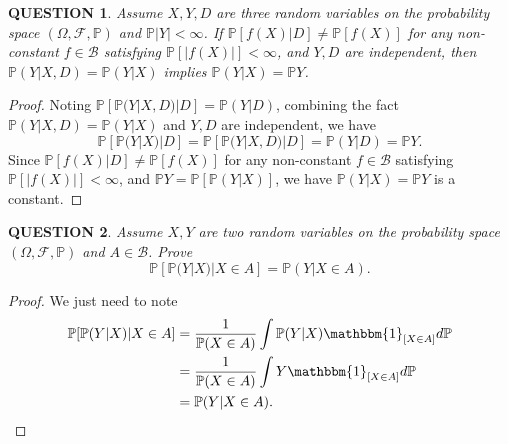 \documentclass[12pt]{article}
\renewcommand{\b}{\mathscr{B}}
\renewcommand{\(}{\left(}%
\renewcommand{\)}{\right)}%
\renewcommand{\[}{\left[}%
\renewcommand{\]}{\right]}%
\newcommand{\p}{\mathbb{P}}
\newcommand{\f}{\mathscr{F}}
\newtheorem{question}{QUESTION}[section]}
\newtheorem{proof}{Proof.}}
\begin{document}
  \begin{question}
  	Assume $X, Y, D$ are three random variables on the probability space $(\Omega,\f,\p)$ and $\p|Y|<\infty$. If $\p[f(X)|D]\neq \p[f(X)]$ for any non-constant $f\in\b$ satisfying $\p[|f(X)|]<\infty$, and $Y,D$ are independent, then $\p(Y|X,D)=\p(Y|X)$ implies $\p(Y|X)=\p Y$.
  \end{question}
  \begin{proof}
  	Noting $\p[\p(Y|X,D)|D]=\p(Y|D)$, combining the fact $\p(Y|X,D)=\p(Y|X)$ and $Y,D$ are independent, we have
  	\begin{equation*}
  		\p[\p(Y|X)|D]=\p[\p(Y|X,D)|D]=\p(Y|D)=\p Y.
  	\end{equation*}
  	Since $\p[f(X)|D]\neq \p[f(X)]$ for any non-constant $f\in\b$ satisfying $\p[|f(X)|]<\infty$, and $\p Y=\p[\p(Y|X)]$, we have $\p(Y|X)=\p Y$ is a constant. 
  \end{proof}
  
  \begin{question}
  	Assume $X, Y$ are two random variables on the probability space $(\Omega,\f,\p)$ and $A\in\b$. Prove
  	\begin{equation*}
  	\p[\p(Y|X)|X\in A]=\p(Y|X\in A).
  \end{equation*}
  \end{question}
  \begin{proof}
  	We just need to note
  	\begin{equation*}
  		\begin{split}
  			\p[\p(Y|X)|X\in A]&=\frac{1}{\p(X\in A)}\int \p(Y|X)\mathbbm{1}_{[X\in A]}d\p\\
  			&=\frac{1}{\p(X\in A)}\int Y\mathbbm{1}_{[X\in A]}d\p\\
  			&=\p(Y|X\in A).
  		\end{split}
  	\end{equation*}
  \end{proof}
  
\end{document}
